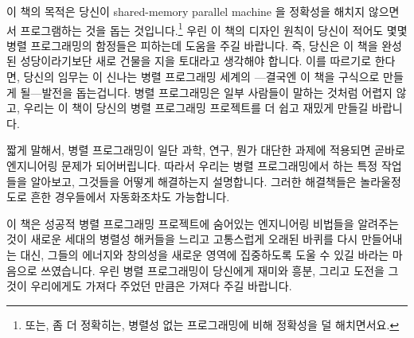 

이 책의 목적은 당신이 shared-memory parallel machine 을 정확성을 해치지
않으면서 프로그램하는 것을 돕는 것입니다.\footnote{
	또는, 좀 더 정확히는, 병렬성 없는 프로그래밍에 비해 정확성을 덜
	해치면서요.}
우린 이 책의 디자인 원칙이 당신이 적어도 몇몇 병렬 프로그래밍의 함정들은
피하는데 도움을 주길 바랍니다.
즉, 당신은 이 책을 완성된 성당이라기보단 새로 건물을 지을 토대라고 생각해야
합니다.
이를 따르기로 한다면, 당신의 임무는 이 신나는 병렬 프로그래밍 세계의 ---결국엔
이 책을 구식으로 만들게 될---발전을 돕는겁니다.
병렬 프로그래밍은 일부 사람들이 말하는 것처럼 어렵지 않고, 우리는 이 책이
당신의 병렬 프로그래밍 프로젝트를 더 쉽고 재밌게 만들길 바랍니다.
\iffalse

The purpose of this book is to help you program
shared-memory parallel machines without risking your sanity.\footnote{
	Or, perhaps more accurately, without much greater risk to your
	sanity than that incurred by non-parallel programming.
	Which, come to think of it, might not be saying all that much.}
We hope that this book's design principles will help you avoid at least some
parallel-programming pitfalls.
That said, you should think of this book as a foundation on which to build,
rather than as a completed cathedral.
Your mission, if you choose to accept, is to help make further progress
in the exciting field of parallel programming---progress that will
in time render this book obsolete.
Parallel programming is not as hard as some say, and we hope
that this book makes your parallel-programming projects easier and
more fun.
\fi

짧게 말해서, 병렬 프로그래밍이 일단 과학, 연구, 뭔가 대단한 과제에 적용되면
곧바로 엔지니어링 문제가 되어버립니다.
따라서 우리는 병렬 프로그래밍에서 하는 특정 작업들을 알아보고, 그것들을 어떻게
해결하는지 설명합니다.
그러한 해결책들은 놀라울정도로 흔한 경우들에서 자동화조차도 가능합니다.
\iffalse

In short, where parallel programming once focused on science, research,
and grand-challenge projects, it is quickly becoming an engineering
discipline.
We therefore examine specific parallel-programming tasks
and describe how to approach them.
In some surprisingly common cases, they can even be automated.
\fi

이 책은 성공적 병렬 프로그래밍 프로젝트에 숨어있는 엔지니어링 비법들을 알려주는
것이 새로운 세대의 병렬성 해커들을 느리고 고통스럽게 오래된 바퀴를 다시
만들어내는 대신, 그들의 에너지와 창의성을 새로운 영역에 집중하도록 도울 수 있길
바라는 마음으로 쓰였습니다.
우린 병렬 프로그래밍이 당신에게 재미와 흥분, 그리고 도전을 그것이 우리에게도
가져다 주었던 만큼은 가져다 주길 바랍니다.
\iffalse

